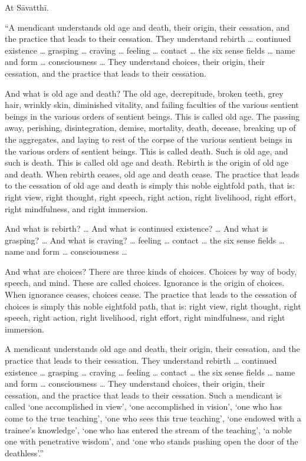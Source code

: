 \documentclass[12pt,openany]{book}%
\begin{document}
At \textsanskrit{Sāvatthī}. 

“A mendicant understands old age and death, their origin, their cessation, and the practice that leads to their cessation. They understand rebirth … continued existence … grasping … craving … feeling … contact … the six sense fields … name and form … consciousness … They understand choices, their origin, their cessation, and the practice that leads to their cessation. 

And what is old age and death? The old age, decrepitude, broken teeth, grey hair, wrinkly skin, diminished vitality, and failing faculties of the various sentient beings in the various orders of sentient beings. This is called old age. The passing away, perishing, disintegration, demise, mortality, death, decease, breaking up of the aggregates, and laying to rest of the corpse of the various sentient beings in the various orders of sentient beings. This is called death. Such is old age, and such is death. This is called old age and death. Rebirth is the origin of old age and death. When rebirth ceases, old age and death cease. The practice that leads to the cessation of old age and death is simply this noble eightfold path, that is: right view, right thought, right speech, right action, right livelihood, right effort, right mindfulness, and right immersion. 

And what is rebirth? … And what is continued existence? … And what is grasping? … And what is craving? … feeling … contact … the six sense fields … name and form … consciousness … 

And what are choices? There are three kinds of choices. Choices by way of body, speech, and mind. These are called choices. Ignorance is the origin of choices. When ignorance ceases, choices cease. The practice that leads to the cessation of choices is simply this noble eightfold path, that is: right view, right thought, right speech, right action, right livelihood, right effort, right mindfulness, and right immersion. 

A mendicant understands old age and death, their origin, their cessation, and the practice that leads to their cessation. They understand rebirth … continued existence … grasping … craving … feeling … contact … the six sense fields … name and form … consciousness … They understand choices, their origin, their cessation, and the practice that leads to their cessation. Such a mendicant is called ‘one accomplished in view’, ‘one accomplished in vision’, ‘one who has come to the true teaching’, ‘one who sees this true teaching’, ‘one endowed with a trainee’s knowledge’, ‘one who has entered the stream of the teaching’, ‘a noble one with penetrative wisdom’, and ‘one who stands pushing open the door of the deathless’.” 
\end{document}
